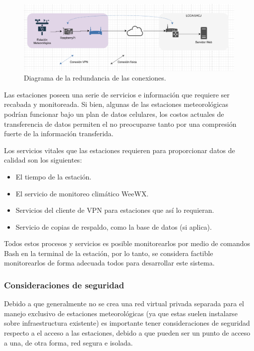 \begin{figure}[!ht]
	\centering
	\includegraphics[width=.75\linewidth]{images/diagrams/conexion.png}
	\caption{Diagrama de la redundancia de las conexiones.}
	\label{fig:conexion_redundancia}
\end{figure}

Las estaciones poseen una serie de servicios e información que requiere ser recabada y monitoreada. Si bien, algunas de las estaciones meteorológicas podrían funcionar bajo un plan de datos celulares, los costos actuales de transferencia de datos permiten el no preocuparse tanto por una compresión fuerte de la información transferida.

Los servicios vitales que las estaciones requieren para proporcionar datos de calidad son los siguientes:

\begin{itemize}
   \item El tiempo de la estación.
   \item El servicio de monitoreo climático WeeWX.
   \item Servicios del cliente de VPN para estaciones que así lo requieran.
   \item Servicio de copias de respaldo, como la base de datos (si aplica).
\end{itemize}

Todos estos procesos y servicios es posible monitorearlos por medio de comandos Bash en la terminal de la estación, por lo tanto, se considera factible monitorearlos de forma adecuada todos para desarrollar este sistema.

\subsubsection{Consideraciones de seguridad}

Debido a que generalmente no se crea una red virtual privada separada para el manejo exclusivo de estaciones meteorológicas (ya que estas suelen instalarse sobre infraestructura existente) es importante tener consideraciones de seguridad respecto a el acceso a las estaciones, debido a que pueden ser un punto de acceso a una, de otra forma, red segura e isolada.

